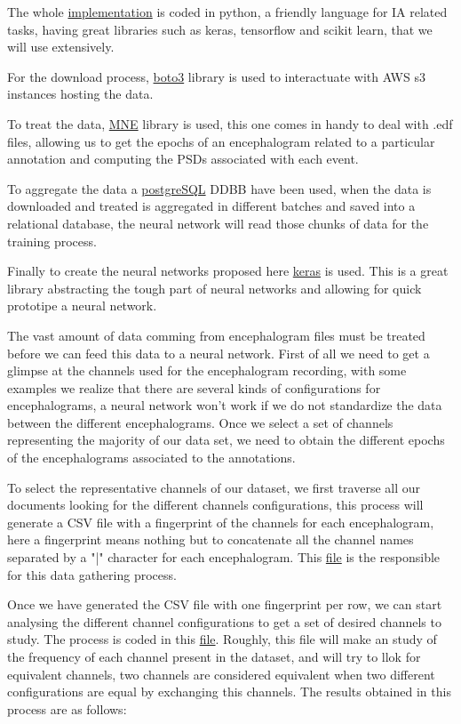 The whole \href{https://github.com/szz-dvl/soundless/tree/main}{implementation} is coded in python, a friendly language for IA related tasks, having great libraries such as keras, tensorflow and scikit learn, that we will use extensively.

For the download process, \href{https://pypi.org/project/boto3/}{boto3} library is used to interactuate with AWS s3 instances hosting the data.

To treat the data, \href{https://mne.tools/stable/index.html}{MNE} library is used, this one comes in handy to deal with .edf files, allowing us to get the epochs of an encephalogram related to a particular annotation and computing the PSDs associated with each event.

To aggregate the data a \href{https://www.postgresql.org/}{postgreSQL} DDBB have been used, when the data is downloaded and treated is aggregated in different batches and saved into a relational database, the neural network will read those chunks of data for the training process.

Finally to create the neural networks proposed here \href{https://keras.io/}{keras} is used. This is a great library abstracting the tough part of neural networks and allowing for quick prototipe a neural network. 

The vast amount of data comming from encephalogram files must be treated before we can feed this data to a neural network.
First of all we need to get a glimpse at the channels used for the encephalogram recording, with some examples we realize that there are several kinds of configurations for encephalograms, a neural network won't work if we do not standardize the data between the different encephalograms. Once we select a set of channels representing the majority of our data set, we need to obtain the different epochs of the encephalograms associated to the annotations. 

To select the representative channels of our dataset, we first traverse all our documents looking for the different channels configurations, this process will generate a CSV file with a fingerprint of the channels for each encephalogram, here a fingerprint means nothing but to concatenate all the channel names separated by a "|" character for each encephalogram. This \href{https://github.com/szz-dvl/soundless/blob/main/parser_channels.py}{file} is the responsible for this data gathering process.

Once we have generated the CSV file with one fingerprint per row, we can start analysing the different channel configurations to get a set of desired channels to study. The process is coded in this \href{https://github.com/szz-dvl/soundless/blob/main/channels.py}{file}. Roughly, this file will make an study of the frequency of each channel present in the dataset, and will try to llok for equivalent channels, two channels are considered equivalent when two different configurations are equal by exchanging this channels. The results obtained in this process are as follows:

